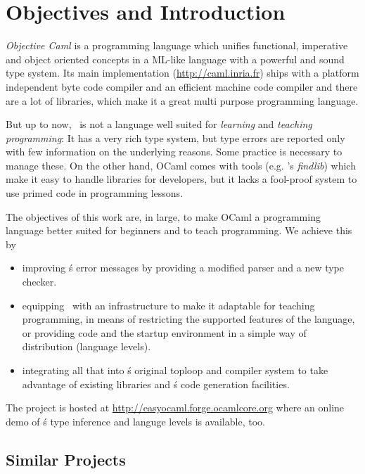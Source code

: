 
\section{Objectives and Introduction}
\label{sec:intro}

\label{hd001}
\textsl{Objective Caml} \citep{leroy2008} is a programming language which unifies 
functional, imperative and object oriented concepts in a ML-like 
language with a powerful and sound type system.  Its main implementation 
(\url{http://caml.inria.fr}) ships with a platform independent byte code
compiler and an efficient machine code compiler and there are a lot of
libraries, which make it a great multi purpose programming language.

But up to now, \ocaml\ is not a language well suited for \emph{learning} and
\emph{teaching programming}:
It has a very rich type system, but type errors are reported only with few
information on the underlying reasons.
Some practice is necessary to manage these.
On the other hand, OCaml comes with tools (e.g.  \citeauthor{stolpmann}'s
\emph{findlib}) which make it easy to handle libraries for developers, but it
lacks a fool-proof system to use primed code in programming lessons.

The objectives of this work are, in large, to make OCaml a
programming language better suited for beginners and to teach programming. We
achieve this by

\begin{itemize}
    \item improving \ocaml\'s error messages by providing a modified 
        parser and a new type checker.
    \item equipping \ocaml\ with an infrastructure to make it 
        adaptable for teaching programming, in means of restricting the 
        supported features of the language, or providing code and the 
        startup environment in a simple way of distribution (language 
        levels).
    \item integrating all that into \ocaml\'s original toploop and 
        compiler system to take advantage of existing libraries and 
        \ocaml\'s code generation facilities.
\end{itemize}
The project is hosted at
\url{http://easyocaml.forge.ocamlcore.org}  where an online demo of \easyocaml\'s
type inference and languge levels is available, too.

\subsection{Similar Projects}

